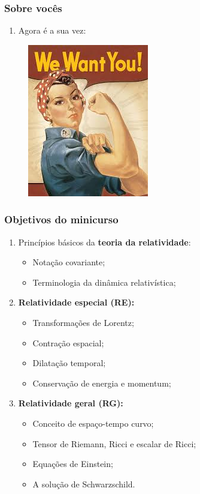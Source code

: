 \documentclass[11pt, brazil]{beamer}
\begin{document}

\begin{frame}
\frametitle{Sobre vocês}
\begin{enumerate}
 \justifying
 \item Agora é a sua vez: 
\end{enumerate}
\begin{figure}
 \includegraphics[scale=0.5]{figuras/u.jpeg}
\end{figure}  
\end{frame}



\begin{frame}
\frametitle{Objetivos do minicurso}
\begin{enumerate}
 \justifying
 \item Princípios básicos da {\color{crimson}\bf teoria da relatividade}:
  \begin{itemize}
   \justifying
   \item Notação covariante;
   \item Terminologia da dinâmica relativística; 
  \end{itemize}
 \pause  
 \item {\color{crimson}\bf Relatividade especial (RE):}
  \begin{itemize}
   \justifying
  \item Transformações de Lorentz;
  \item Contração espacial;
  \item Dilatação temporal;
  \item Conservação de energia e momentum;  
 \end{itemize}     
 \pause  
 \item {\color{crimson}\bf Relatividade geral (RG):}
  \begin{itemize}
   \justifying
  \item Conceito de espaço-tempo curvo;
  \item Tensor de Riemann, Ricci e escalar de Ricci;
  \item Equações de Einstein;
  \item A solução de Schwarzschild.
 \end{itemize}     
\end{enumerate}  
\end{frame}

\end{document}
